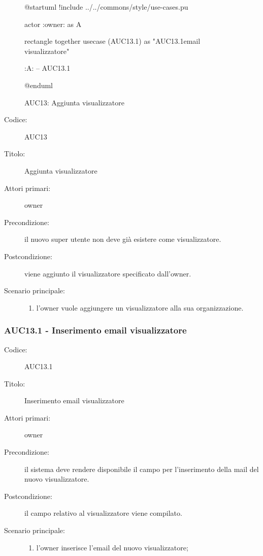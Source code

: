 \documentclass[../../../analisi-dei-requisiti.tex]{subfiles}
\begin{document}
\begin{figure}[h!]
  \centering
  \begin{plantuml}
  @startuml
  !include ../../commons/style/use-cases.pu

  actor :owner: as A

  rectangle {
    together {
      usecase (AUC13.1) as "AUC13.1\nInserimento email visualizzatore"
    }
  }

  :A: -- AUC13.1

  @enduml
  \end{plantuml}
  \caption{AUC13: Aggiunta visualizzatore}
  \label{fig:auc13}
\end{figure}

\begin{description}
  \item[Codice:] AUC13
  \item[Titolo:] Aggiunta visualizzatore
  \item[Attori primari:] owner
  \item[Precondizione:] il nuovo super utente non deve già esistere come visualizzatore.
  \item[Postcondizione:] viene aggiunto il visualizzatore specificato dall'owner.
  \item[Scenario principale:]
  \begin{enumerate}
    \item l'owner vuole aggiungere un visualizzatore alla sua organizzazione.
  \end{enumerate}
\end{description}

\subsubsection{AUC13.1 - Inserimento email visualizzatore}%
\label{subs:AUC13.1}
\begin{description}
  \item[Codice:] AUC13.1
  \item[Titolo:] Inserimento email visualizzatore
  \item[Attori primari:] owner
  \item[Precondizione:] il sistema deve rendere disponibile il campo per l'inserimento della mail del nuovo visualizzatore.
  \item[Postcondizione:] il campo relativo al visualizzatore viene compilato.
  \item[Scenario principale:]
  \begin{enumerate}
    \item l'owner inserisce l'email del nuovo visualizzatore;
  \end{enumerate}
\end{description}
\end{document}
